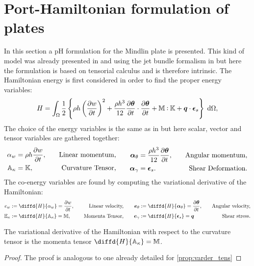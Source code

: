 \section{Port-Hamiltonian formulation of plates}
In this section a pH formulation for the Mindlin plate is presented. This kind of model was already presented in \cite{macchelli2005mindlin} and using the jet bundle formalism in \cite{schoberl2017mindlin} but here the formulation is based on tensorial calculus and is therefore intrinsic. 
	The Hamiltonian energy is first considered in order to find the proper energy variables:
	\begin{equation}
	\label{eq:H_min}
	H = \int_{\Omega} \frac{1}{2} \left\{ \rho h \left(\diffp{w}{t} \right)^2 + \frac{\rho h^3}{12} \diffp{\bm{\theta}}{t} \cdot   \diffp{\bm{\theta}}{t} +   \mathbb{M} \cddot \mathbb{K} + \bm{q} \cdot \bm{\epsilon}_s  \right\}  \d\Omega, 
	\end{equation}
	The choice of the energy variables is the same as in \cite{macchelli2005mindlin} but here scalar,  vector and tensor variables are gathered together:
\begin{equation}
\begin{aligned}
\alpha_w &= \rho h \diffp{w}{t}, \quad &\text{Linear momentum,} \\
\mathbb{A}_{\kappa} &= \mathbb{K}, \quad &\text{Curvature Tensor,} \\
\end{aligned} \qquad
\begin{aligned}
\bm\alpha_{\theta} &=  \frac{\rho h^3}{12} \diffp{\bm{\theta}}{t}, \quad &\text{Angular momentum,}\\
\bm\alpha_{\gamma} &= \bm{\epsilon}_s. \quad &\text{Shear Deformation.}\\
\end{aligned}
\end{equation}
The co-energy variables are found by computing the variational derivative of the Hamiltonian:
\begin{equation}
\begin{aligned}
e_w &:= \diffd{H}{\alpha_w} = \diffp{w}{t},  \quad &\text{Linear velocity,} \\
\mathbb{E}_{\kappa} &:= \diffd{H}{\mathbb{A}_{\kappa}} = \mathbb{M}, \quad &\text{Momenta Tensor,}\\
\end{aligned} \qquad
\begin{aligned}
\bm{e}_{\theta} &:= \diffd{H}{\bm\alpha_{\theta}} = \diffp{\bm{\theta}}{t}, \quad &\text{Angular velocity,}  \\
\bm{e}_{\gamma} &:= \diffd{H}{\bm{\epsilon}_s} = \bm{q} \quad &\text{Shear stress.} \\
\end{aligned}
\end{equation}
\begin{proposition}
	The variational derivative of the Hamiltonian with respect to the curvature tensor is the momenta tensor $\diffd{H}{\mathbb{A}_{\kappa}} = \mathbb{M}$.
	\begin{proof}
		The proof is analogous to one already detailed for \ref{prop:varder_tens}
	\end{proof}
\end{proposition}

